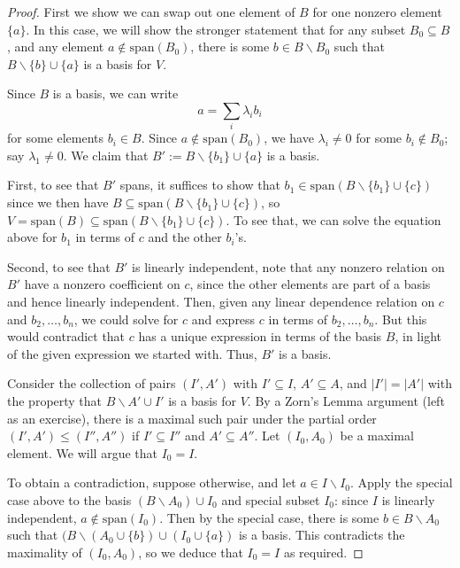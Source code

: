 \documentclass[12pt]{report}
\numberwithin{equation}{section}
\numberwithin{theorem}{chapter}
\theoremstyle{definition}
\newtheorem*{basic properties}{Basic Properties}
\newtheorem*{Important Remark}{Important Remark}
\begin{document}
\begin{proof} First we show we can swap out one element of $B$ for one nonzero element $\{a\}$. In this case, we will show the stronger statement that for any subset $B_0 \subseteq B$, and any element $a\notin \mathrm{span}(B_0)$, there is some $b\in B\smallsetminus B_0$ such that $B\smallsetminus \{b\} \cup \{a\}$ is a basis for $V$.



Since $B$ is a basis, we can write 
\[ a = \sum_i \lambda_i b_i \]
for some elements $b_i \in B$. Since $a\notin \mathrm{span}(B_0)$, we have $\lambda_i\neq 0$ for some $b_i\notin B_0$; say $\lambda_1\neq 0$. We claim that $B' := B\smallsetminus \{ b_1\} \cup \{a\}$ is a basis.

First, to see that $B'$ spans, it suffices to show that $b_1 \in \mathrm{span} ( B\smallsetminus \{ b_1\} \cup \{c\} )$ since we then have $B \subseteq \mathrm{span} ( B\smallsetminus \{ b_1\} \cup \{c\} )$, so $V = \mathrm{span}(B) \subseteq \mathrm{span} ( B\smallsetminus \{ b_1\} \cup \{c\} )$. To see that, we can solve the equation above for $b_1$ in terms of $c$ and the other $b_i$'s.

Second, to see that $B'$ is linearly independent, note that any nonzero relation on $B'$ have a nonzero coefficient on $c$, since the other elements are part of a basis and hence linearly independent. Then, given any linear dependence relation on $c$ and $b_2,\dots,b_n$, we could solve for $c$ and express $c$ in terms of $b_2,\dots,b_n$. But this would contradict that $c$ has a unique expression in terms of the basis $B$, in light of the given expression we started with. Thus, $B'$ is a basis.

Consider the collection of pairs $(I', A')$ with $I' \subseteq I$, $A' \subseteq A$, and $|I'|=|A'|$ with the property that $B\smallsetminus A' \cup I'$ is a basis for $V$. By a Zorn's Lemma argument (left as an exercise), there is a maximal such pair under the partial order $(I',A')\leq (I'',A'')$ if $I'\subseteq I''$ and $A'\subseteq A''$. Let $(I_0,A_0)$ be a maximal element. We will argue that $I_0=I$.

To obtain a contradiction, suppose otherwise, and let $a\in I \smallsetminus I_0$. Apply the special case above to the basis $(B\smallsetminus A_0) \cup I_0$ and special subset $I_0$: since $I$ is linearly independent, $a\notin \mathrm{span}(I_0)$. Then by the special case, there is some $b\in B\smallsetminus A_0$ such that  $(B\smallsetminus (A_0  \cup \{b\}) \cup (I_0 \cup \{a\})$ is a basis. This contradicts the maximality of $(I_0,A_0)$, so we deduce that $I_0=I$ as required.
\end{proof}
 
\end{document}
